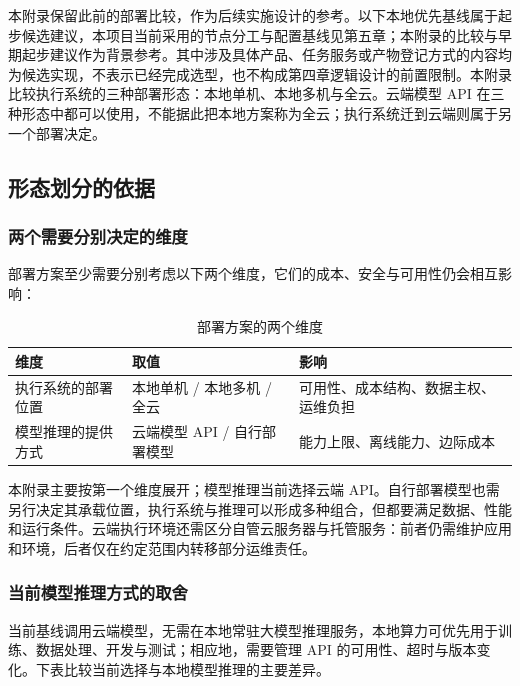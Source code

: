 \documentclass[11pt,a4paper]{article}
\begin{document}
本附录保留此前的部署比较，作为后续实施设计的参考。以下本地优先基线属于起步候选建议，本项目当前采用的节点分工与配置基线见第五章；本附录的比较与早期起步建议作为背景参考。其中涉及具体产品、任务服务或产物登记方式的内容均为候选实现，不表示已经完成选型，也不构成第四章逻辑设计的前置限制。本附录比较执行系统的三种部署形态：本地单机、本地多机与全云。云端模型 API 在三种形态中都可以使用，不能据此把本地方案称为全云；执行系统迁到云端则属于另一个部署决定。

\subsection{形态划分的依据}

\subsubsection{两个需要分别决定的维度}

部署方案至少需要分别考虑以下两个维度，它们的成本、安全与可用性仍会相互影响：

\begin{table}[H]
\centering
\renewcommand{\arraystretch}{1.4}
\begin{tabularx}{\textwidth}{P{3cm} P{4.5cm} L}
\toprule
\textbf{维度} & \textbf{取值} & \textbf{影响} \\
\midrule
执行系统的部署位置 & 本地单机 / 本地多机 / 全云 & 可用性、成本结构、数据主权、运维负担 \\
模型推理的提供方式 & 云端模型 API / 自行部署模型 & 能力上限、离线能力、边际成本 \\
\bottomrule
\end{tabularx}
\caption{部署方案的两个维度}
\end{table}

本附录主要按第一个维度展开；模型推理当前选择云端 API。自行部署模型也需另行决定其承载位置，执行系统与推理可以形成多种组合，但都要满足数据、性能和运行条件。云端执行环境还需区分自管云服务器与托管服务：前者仍需维护应用和环境，后者仅在约定范围内转移部分运维责任。

\subsubsection*{当前模型推理方式的取舍}

当前基线调用云端模型，无需在本地常驻大模型推理服务，本地算力可优先用于训练、数据处理、开发与测试；相应地，需要管理 API 的可用性、超时与版本变化。下表比较当前选择与本地模型推理的主要差异。
\end{document}
